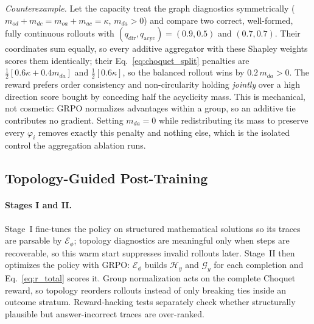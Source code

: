 \noindent\textit{Counterexample.} Let the capacity treat the graph diagnostics symmetrically ($m_{od}+m_{dc}=m_{oa}+m_{ac}=\kappa$, $m_{da}>0$) and compare two correct, well-formed, fully continuous rollouts with $(q_{\mathrm{dir}},q_{\mathrm{acyc}})=(0.9,0.5)$ and $(0.7,0.7)$. Their coordinates sum equally, so every additive aggregator with these Shapley weights scores them identically; their Eq.~\ref{eq:choquet_split} penalties are $\tfrac12[0.6\kappa+0.4m_{da}]$ and $\tfrac12[0.6\kappa]$, so the balanced rollout wins by $0.2\,m_{da}>0$. The reward prefers order consistency and non-circularity holding \emph{jointly} over a high direction score bought by conceding half the acyclicity mass. This is mechanical, not cosmetic: GRPO normalizes advantages within a group, so an additive tie contributes no gradient. Setting $m_{da}=0$ while redistributing its mass to preserve every $\varphi_i$ removes exactly this penalty and nothing else, which is the isolated control the aggregation ablation runs.

\subsection{Topology-Guided Post-Training}
\label{sec:post_training}

\paragraph{Stages I and II.}
Stage~I fine-tunes the policy on structured mathematical solutions so its traces are parsable by $\mathcal{E}_{\phi}$; topology diagnostics are meaningful only when steps are recoverable, so this warm start suppresses invalid rollouts later. Stage~II then optimizes the policy with GRPO: $\mathcal{E}_{\phi}$ builds $\mathcal{H}_y$ and $\mathcal{G}_y$ for each completion and Eq.~\ref{eq:r_total} scores it. Group normalization acts on the complete Choquet reward, so topology reorders rollouts instead of only breaking ties inside an outcome stratum. Reward-hacking tests separately check whether structurally plausible but answer-incorrect traces are over-ranked.

